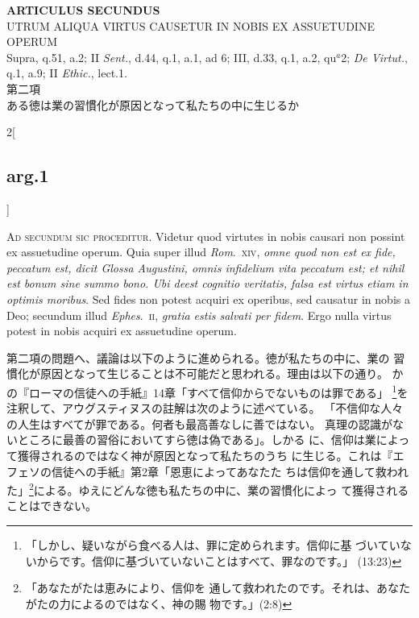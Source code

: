 \documentclass[paper=a4paper,fontsize=10pt,jafontsize=9pt,titlepage]{jlreq}
\begin{document}
\begin{center}
{\Large {\bfseries ARTICULUS SECUNDUS}}\\
{\large UTRUM ALIQUA VIRTUS CAUSETUR IN NOBIS EX ASSUETUDINE OPERUM}\\
{\footnotesize Supra, q.51, a.2; II {\itshape Sent.}, d.44, q.1, a.1, ad 6; III, d.33, q.1, a.2, qu$^{a}$2; {\itshape De Virtut.}, q.1, a.9; II {\itshape Ethic.}, lect.1.}\\
{\Large 第二項\\ある徳は業の習慣化が原因となって私たちの中に生じるか}
\end{center}

\begin{paracol}{2}[\subsection{arg.1}]

{\scshape Ad secundum sic proceditur}. Videtur quod virtutes in nobis
causari non possint ex assuetudine operum. Quia super illud {\itshape
Rom}.~{\scshape xiv}, {\itshape omne quod non est ex fide, peccatum
est, dicit Glossa Augustini, omnis infidelium vita peccatum est; et
nihil est bonum sine summo bono. Ubi deest cognitio veritatis, falsa
est virtus etiam in optimis moribus}. Sed fides non potest acquiri ex
operibus, sed causatur in nobis a Deo; secundum illud {\itshape
Ephes}.~{\scshape ii}, {\itshape gratia estis salvati per fidem}. Ergo
nulla virtus potest in nobis acquiri ex assuetudine operum.

\switchcolumn

第二項の問題へ、議論は以下のように進められる。徳が私たちの中に、業の
 習慣化が原因となって生じることは不可能だと思われる。理由は以下の通り。
 かの『ローマの信徒への手紙』14章「すべて信仰からでないものは罪である」
 \footnote{「しかし、疑いながら食べる人は、罪に定められます。信仰に基
 づいていないからです。信仰に基づいていないことはすべて、罪なのです。」
 (13:23)}を注釈して、アウグスティヌスの註解は次のように述べている。
 「不信仰な人々の人生はすべてが罪である。何者も最高善なしに善ではない。
 真理の認識がないところに最善の習俗においてすら徳は偽である」。しかる
 に、信仰は業によって獲得されるのではなく神が原因となって私たちのうち
 に生じる。これは『エフェソの信徒への手紙』第2章「恩恵によってあなたた
 ちは信仰を通して救われた」\footnote{「あなたがたは恵みにより、信仰を
 通して救われたのです。それは、あなたがたの力によるのではなく、神の賜
 物です。」(2:8)}による。ゆえにどんな徳も私たちの中に、業の習慣化によっ
 て獲得されることはできない。


\end{paracol}
\end{document}
